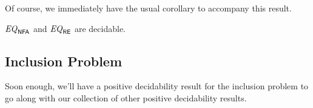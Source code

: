 Of course, we immediately have the usual corollary to accompany this result.

\begin{corollary}
$\mathit{EQ}_{\textsf{NFA}}$ and $\mathit{EQ}_{\textsf{RE}}$ are decidable.
\end{corollary}

\subsection*{Inclusion Problem}

\begin{construction}
Soon enough, we'll have a positive decidability result for the inclusion problem to go along with our collection of other positive decidability results.
\end{construction}